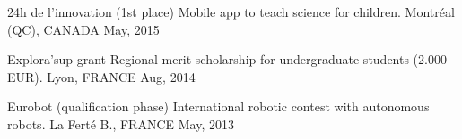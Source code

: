 \begin{cvhonors}
\cvhonor
{24h de l'innovation (1st place)} %
{Mobile app to teach science for children.} %
{\hspace{-5mm}Montréal (QC), CANADA} %
{May, 2015} %


\cvhonor
{Explora'sup grant} %
{Regional merit scholarship for undergraduate students (2.000 EUR).} %
{Lyon, FRANCE} %
{Aug, 2014} %

\cvhonor
{Eurobot (qualification phase)} %
{International robotic contest with autonomous robots.} %
{La Ferté B., FRANCE} %
{May, 2013} %

\end{cvhonors}
